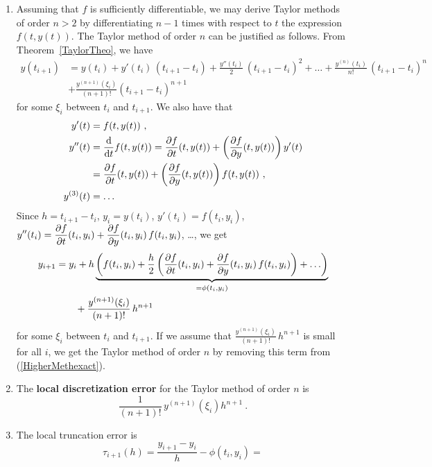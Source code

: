 \begin{rmkList} \label{Taylorordern}
\begin{enumerate}
\item Assuming that $f$ is sufficiently differentiable, we may derive
Taylor methods of order $n>2$ by differentiating $n-1$ times with respect to
$t$ the expression $f(t,y(t))$.  The Taylor method of order $n$ can be
justified as follows.  From Theorem~\ref{TaylorTheo}, we have
\begin{align*}
y(t_{i+1}) &= y(t_i) + y'(t_i)\,(t_{i+1} -t_i) +
\frac{y''(t_i)}{2}\,(t_{i+1}-t_i)^2 + \ldots +
\frac{y^{(n)}(t_i)}{n!}\,(t_{i+1}-t_i)^n \\
&+ \frac{y^{(n+1)}(\xi_i)}{(n+1)!}\left(t_{i+1} - t_i\right)^{n+1}
\end{align*}
for some $\xi_i$ between $t_i$ and $t_{i+1}$.  We also have that
\begin{align*}
y'(t) &= f(t,y(t)) \ , \\
y''(t) &= \dfdx{f(t,y(t))}{t}
= \pdydx{f}{t}(t,y(t)) + \left( \pdydx{f}{y}(t,y(t)) \right)y'(t) \\
 &= \pdydx{f}{t}(t,y(t)) + \left( \pdydx{f}{y}(t,y(t)) \right)f(t,y(t))
\ ,\\
y^{(3)}(t) &= \ldots
\end{align*}
Since $h=t_{i+1} -t_i$, $y_i = y(t_i)$, $y'(t_i) = f(t_i,y_i)$,
$\displaystyle y''(t_i) =
\pdydx{f}{t}(t_i,y_i) + \pdydx{f}{y}(t_i,y_i)\, f(t_i,y_i)$, \ldots, we get
\begin{equation}\label{HigherMethexact}
\begin{split}
y_{i+1} &= y_i + h\underbrace{\left( f(t_i,y_i) + \frac{h}{2} \left(
\pdydx{f}{t}(t_i,y_i) + \pdydx{f}{y}(t_i,y_i) \, f(t_i,y_i)
\right) + \ldots \right)}_{=\phi(t_i,y_i)} \\
& \qquad + \frac{y^{(n+1)}(\xi_i)}{(n+1)!}\,h^{n+1}
\end{split}
\end{equation}
for some $\xi_i$ between $t_i$ and $t_{i+1}$.  If we assume that
$\displaystyle \frac{y^{(n+1)}(\xi_i)}{(n+1)!}\,h^{n+1}$ is small
for all $i$, we get the Taylor method of order $n$ by removing this
term from (\ref{HigherMethexact}).
\item The
{\bfseries local discretization error} for the Taylor method 
of order $n$ is
\[
\frac{1}{(n+1)!}\, y^{(n+1)}(\xi_i)h^{n+1} \ .
\]
\item The local truncation error is
\[
\tau_{i+1}(h) = \frac{y_{i+1} - y_i}{h} - \phi(t_i,y_i) = 
\]
\end{enumerate}
\end{rmkList}
